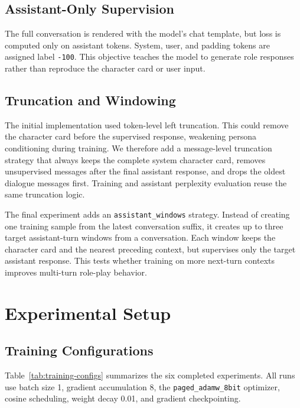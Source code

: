 \documentclass{article}
\begin{document}
\subsection{Assistant-Only Supervision}

The full conversation is rendered with the model's chat template, but loss is
computed only on assistant tokens. System, user, and padding tokens are assigned
label \texttt{-100}. This objective teaches the model to generate role
responses rather than reproduce the character card or user input.

\subsection{Truncation and Windowing}

The initial implementation used token-level left truncation. This could remove
the character card before the supervised response, weakening persona
conditioning during training. We therefore add a message-level truncation
strategy that always keeps the complete system character card, removes
unsupervised messages after the final assistant response, and drops the oldest
dialogue messages first. Training and assistant perplexity evaluation reuse the
same truncation logic.

The final experiment adds an \texttt{assistant\_windows} strategy. Instead of
creating one training sample from the latest conversation suffix, it creates up
to three target assistant-turn windows from a conversation. Each window keeps
the character card and the nearest preceding context, but supervises only the
target assistant response. This tests whether training on more next-turn
contexts improves multi-turn role-play behavior.

\section{Experimental Setup}

\subsection{Training Configurations}

Table~\ref{tab:training-configs} summarizes the six completed experiments. All
runs use batch size 1, gradient accumulation 8, the \texttt{paged\_adamw\_8bit}
optimizer, cosine scheduling, weight decay 0.01, and gradient checkpointing.
\end{document}
